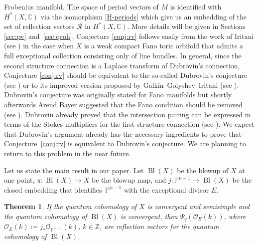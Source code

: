 \documentclass[10pt,a4paper]{article}
\numberwithin{equation}{section}
\newtheorem{Theorem}{Theorem}[section]
\newcommand{\CC}{\mathbb{C}}
\newcommand{\ZZ}{\mathbb{Z}}
\newcommand{\PP}{\mathbb{P}}
\renewcommand{\O}{\mathcal{O}}
\begin{document}
Frobenius manifold. The space of period vectors of $M$ is identified with
$H^*(X,\CC)$ via the isomorphism \eqref{H-periods} which give us an
embedding of the set of reflection vectors $\mathcal{R}$ in $H^*(X,\CC)$. More
details will be given in Sections \ref{sec:pv} and~\ref{sec:qcoh}. Conjecture \ref{conj:rv} follows easily from the work
of Iritani (see \cite{Iritani:gamma_structure}) in the case when $X$
is a weak compact Fano toric orbifold that admits a full exceptional
collection consisting only of line bundles. In general, since the second structure
connection is a Laplace transform of Dubrovin's connection, Conjecture
\ref{conj:rv} should be equivalent to the so-called Dubrovin's
conjecture (see \cite[Conjecture 4.2.2]{Dubrovin1998}) or to its
improved version proposed by Galkin--Golyshev--Iritani (see
\cite[Conjecture 4.6.1]{GGI2016}). Dubrovin's conjecture was
originally stated for Fano manifolds but shortly afterwards Arend
Bayer suggested that the Fano condition should be removed (see
\cite{Ba}). Dubrovin already proved that the intersection pairing can
be expressed in terms of the Stokes multipliers for the first
structure connection (see \cite[Lemma 5.4]{Dubrovin1999}). We expect
that Dubrovin's argument already has the necessary ingredients to
prove that Conjecture~\ref{conj:rv} is equivalent to Dubrovin's
conjecture. We are planning to return to this problem in the near
future.

Let us state the main result in our paper. Let $\operatorname{Bl}(X)$
be the blowup of $X$ at one point, $\pi\colon \operatorname{Bl}(X)\to X$ be
the blowup map, and $j\colon \PP^{n-1}\to \operatorname{Bl}(X)$ be the
closed embedding that identifies~$\PP^{n-1}$ with the exceptional
divisor $E$.

\begin{Theorem}\label{thm}
 If the quantum cohomology of $X$ is convergent and semisimple and
 the quantum cohomology of $\operatorname{Bl}(X)$ is convergent, then
 $\Psi_q(\O_E(k))$, where $\O_E(k):= j_* \O_{\PP^{n-1}}(k)$, $k\in \ZZ$, are
 reflection vectors for the quantum cohomology of
 $\operatorname{Bl}(X)$.
\end{Theorem}
\end{document}
